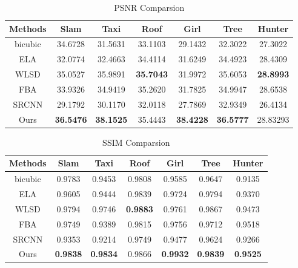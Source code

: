 \documentclass[acmtog]{acmart}
\begin{document}
\begin{table*}
\center
\begin{tabular}{|c|c|c|c|c|c|c|}
  \hline
  Methods & Slam         & Taxi & Roof & Girl      & Tree  & Hunter   \\\hline
bicubic & 34.6728          & 31.5631             &33.1103             &29.1432    		 & 32.3022              & 27.3022  \\  \hline
  ELA     & 32.0774          & 32.4663             &34.4114             &31.6249             & 34.4923               & 28.4309  \\ \hline
  WLSD    & 35.0527          & 35.9891             &\textbf{35.7043}    &31.9972             & 35.6053               & \textbf{28.8993} \\ \hline
  FBA     & 33.9326          & 34.9419             &35.2620             &31.7825             & 34.9947               & 28.6538  \\ \hline
  SRCNN   & 29.1792          & 30.1170             &32.0118             &27.7869             & 32.9349               & 26.4134  \\ \hline
  Ours    & \textbf{36.5476} & \textbf{38.1525}    &35.4443             &\textbf{38.4228}    &\textbf{36.5777}       & 28.83293 \\ \hline
\end{tabular}
\caption{PSNR Comparsion}
\label{tab:psnr_comparsion}
\end{table*}
\begin{table*}
	\center
	\begin{tabular}{|c|c|c|c|c|c|c|}
		\hline
		Methods & Slam        & Taxi       & Roof       			& Girl             & Tree             & Hunter  \\\hline
		bicubic & 0.9783          & 0.9453           & 0.9808     			&0.9585            &0.9647            & 0.9135   \\  \hline
ELA     & 0.9605          & 0.9444           & 0.9839     			&0.9724            &0.9794            & 0.9370   \\ \hline
		WLSD    & 0.9794          & 0.9746           & \textbf{0.9883}      &0.9761            &0.9867            & 0.9473  \\ \hline
		FBA     & 0.9749          & 0.9389           & 0.9815     			&0.9756        	   &0.9712            & 0.9518   \\ \hline
		SRCNN   & 0.9353          & 0.9214           & 0.9749     			&0.9477            &0.9624            & 0.9266 \\ \hline
		Ours    & \textbf{0.9838} & \textbf{0.9834}  & 0.9866     			& \textbf{0.9932}  &\textbf{0.9839 } & \textbf{0.9525 } \\ \hline
	\end{tabular}
	\caption{SSIM Comparsion}
	\label{tab:ssim_comparsion}
\end{table*}
\end{document}

